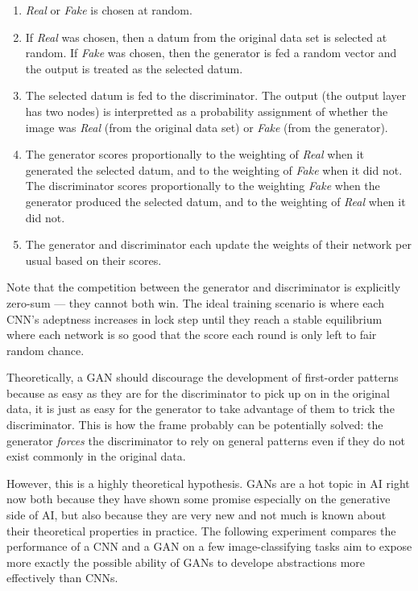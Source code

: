 \documentclass{article}
\renewcommand{\it}{\textit}
\begin{document}
\begin{enumerate}
\item
\it{Real} or \it{Fake} is chosen at random.
\item
If \it{Real} was chosen, then a datum from the original data set is selected at random.
If \it{Fake} was chosen, then the generator is fed a random vector and the output is treated as the selected datum.
\item
The selected datum is fed to the discriminator.
The output (the output layer has two nodes) is interpretted as a probability assignment of whether the image was \it{Real} (from the original data set) or \it{Fake} (from the generator).
\item
The generator scores proportionally to the weighting of \it{Real} when it generated the selected datum, and to the weighting of \it{Fake} when it did not.
The discriminator scores proportionally to the weighting \it{Fake} when the generator produced the selected datum, and  to the weighting of \it{Real} when it did not.
\item
The generator and discriminator each update the weights of their network per usual based on their scores.
\end{enumerate}
Note that the competition between the generator and discriminator is explicitly zero-sum --- they cannot both win. The ideal training scenario is where each CNN's adeptness increases in lock step until they reach a stable equilibrium where each network is so good that the score each round is only left to fair random chance.

Theoretically, a GAN should discourage the development of first-order patterns because as easy as they are for the discriminator to pick up on in the original data, it is just as easy for the generator to take advantage of them to trick the discriminator.
This is how the frame probably can be potentially solved: the generator \it{forces} the discriminator to rely on general patterns even if they do not exist commonly in the original data.

However, this is a highly theoretical hypothesis. GANs are a hot topic in AI right now both because they have shown some promise especially on the generative side of AI, but also because they are very new and not much is known about their theoretical properties in practice.
The following experiment compares the performance of a CNN and a GAN on a few image-classifying tasks aim to expose more exactly the possible ability of GANs to develope abstractions more effectively than CNNs.
\end{document}
